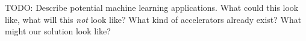 TODO: Describe potential machine learning applications. What could this look like, what will this \textit{not} look like? What kind of accelerators already exist? What might our solution look like?